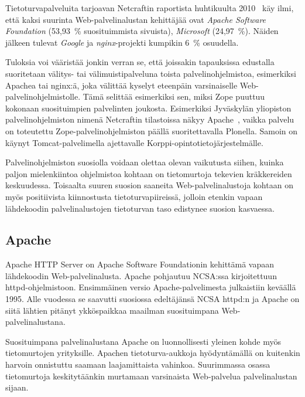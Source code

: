 Tietoturvapalveluita tarjoavan Netcraftin raportista
huhtikuulta 2010~\cite{netcraft} käy ilmi, että kaksi suurinta
Web-palvelinalustan kehittäjää ovat \textit{Apache Software Foundation} (53,93~\% suosituimmista
sivuista), \textit{Microsoft} (24,97~\%). Näiden jälkeen tulevat
\textit{Google} ja \textit{nginx}-projekti kumpikin 6~\% osuudella.

Tuloksia voi vääristää jonkin verran se, että joissakin tapauksissa
edustalla suoritetaan välitys- tai välimuistipalveluna toista
palvelinohjelmistoa, esimerkiksi Apachea tai nginx:ä, joka välittää
kyselyt eteenpäin varsinaiselle
Web-pal\-ve\-lin\-oh\-jel\-mis\-tol\-le. Tämä selittää esimerkiksi
sen, miksi Zope puuttuu kokonaan suosituimpien palvelinten
joukosta. Esimerkiksi Jyväskylän yliopiston palvelinohjelmiston nimenä
Netcraftin tilastoissa näkyy Apache~\cite{netcraft_jyu}, vaikka
palvelu on toteutettu Zope-pal\-ve\-lin\-oh\-jel\-mis\-ton päällä
suoritettavalla Plonella. Samoin on käynyt Tomcat-pal\-ve\-li\-mel\-la
ajettavalle Korppi-o\-pin\-to\-tie\-to\-jär\-jes\-tel\-mäl\-le.

Palvelinohjelmiston suosiolla voidaan olettaa olevan vaikutusta
siihen, kuinka paljon mielenkiintoa ohjelmistoa kohtaan on
tietomurtoja tekevien kräkkereiden keskuudessa. Toisaalta
suuren suosion saaneita Web-palvelinalustoja kohtaan on myös
positiivista kiinnostusta tietoturvapiireissä, jolloin etenkin vapaan
lähdekoodin palvelinalustojen tietoturvan taso edistynee suosion
kasvaessa.

\subsection{Apache}

Apache HTTP Server on Apache Software Foundationin kehittämä vapaan
lähdekoodin Web-palvelinalusta. Apache pohjautuu NCSA:ssa
kirjoitettuun httpd-ohjelmistoon. Ensimmäinen versio
Apache-palvelimesta julkaistiin keväällä 1995. Alle vuodessa se
saavutti suosiossa edeltäjänsä NCSA httpd:n ja Apache on siitä lähtien
pitänyt ykköspaikkaa maailman suosituimpana Web-palvelinalustana.~\cite{apache}

Suosituimpana palvelinalustana Apache on luonnollisesti yleinen kohde
myös tietomurtojen yrityksille. Apachen tietoturva-aukkoja
hyödyntämällä on kuitenkin harvoin onnistuttu saamaan laajamittaista
vahinkoa. Suurimmassa osassa tietomurtoja keskitytäänkin murtamaan
varsinaista Web-palvelua palvelinalustan
sijaan.  %

